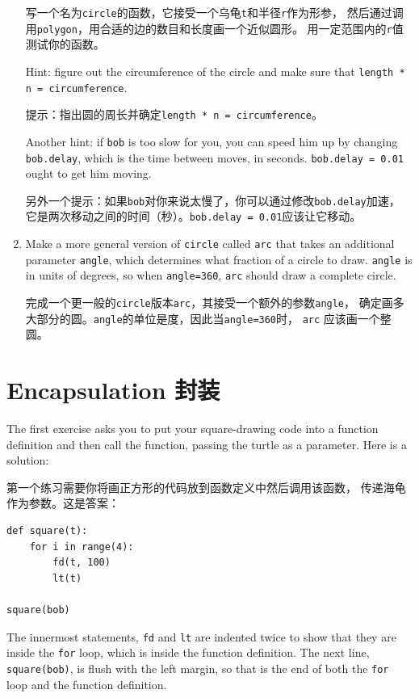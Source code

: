 \documentclass[10pt]{book}
\begin{document}
\begin{CJK}{UTF8}{gbsn}
\begin{enumerate}
写一个名为{\tt circle}的函数，它接受一个乌龟{\tt t}和半径{\tt r}作为形参，
然后通过调用{\tt polygon}，用合适的边的数目和长度画一个近似圆形。
用一定范围内的{\tt r}值测试你的函数。

Hint: figure out the circumference of the circle and make sure that
{\tt length * n = circumference}.

提示：指出圆的周长并确定{\tt length * n = circumference}。

Another hint: if {\tt bob} is too slow for you, you can speed
him up by changing {\tt bob.delay}, which is the time between moves,
in seconds.  {\tt bob.delay = 0.01} ought to get him moving.

另外一个提示：如果{\tt bob}对你来说太慢了，你可以通过修改{\tt bob.delay}加速，
它是两次移动之间的时间（秒）。{\tt bob.delay = 0.01}应该让它移动。


\item Make a more general version of {\tt circle} called {\tt arc}
that takes an additional parameter {\tt angle}, which determines
what fraction of a circle to draw.  {\tt angle} is in units of
degrees, so when {\tt angle=360}, {\tt arc} should draw a complete
circle.

完成一个更一般的{\tt circle}版本{\tt arc}，其接受一个额外的参数{\tt angle}，
确定画多大部分的圆。{\tt angle}的单位是度，因此当{\tt angle=360}时，
{\tt arc} 应该画一个整圆。

\end{enumerate}

\section{Encapsulation 封装}

The first exercise asks you to put your square-drawing code
into a function definition and then call the function, passing
the turtle as a parameter.  Here is a solution:

第一个练习需要你将画正方形的代码放到函数定义中然后调用该函数，
传递海龟作为参数。这是答案：

\begin{verbatim}
def square(t):
    for i in range(4):
        fd(t, 100)
        lt(t)

square(bob)
\end{verbatim}
%
The innermost statements, {\tt fd} and {\tt lt} are
indented twice to show that they are inside the {\tt for} loop,
which is inside the function definition.  The next line,
{\tt square(bob)}, is flush with the left margin, so that is the
end of both the {\tt for} loop and the function definition.


\end{CJK}
\end{document}

